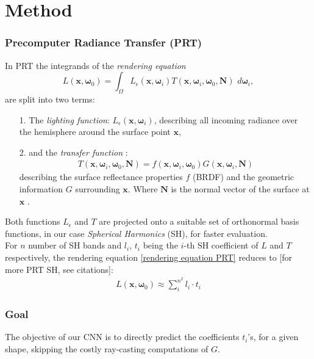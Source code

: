 \section{Method}
\subsubsection*{Precomputer Radiance Transfer (PRT)}
$ \quad $ \\ 

In PRT the integrands of the \textit{rendering equation}
\begin{equation}
L(\bm{x}, \bm{\omega}_0 ) = 
\int_{\Omega} L_{\epsilon}(\bm{x}, \bm{\omega}_i ) 
T(\bm{x},\bm{\omega}_i,\bm{\omega}_0, \bm{N}) 
\,  \, d\bm{\omega}_i ,
\label{rendering equation PRT}
\end{equation}
 are split into two terms:
\begin{itemize}
\item[1.] The \textit{lighting function}: $L_{\epsilon}(\bm{x}, \bm{\omega}_i ) $, describing all incoming radiance over the hemisphere around the surface point $\bm{x} $,
\item[2.] and the \textit{transfer function} :  
\begin{align*}
T(\bm{x},\bm{\omega}_i,\bm{\omega}_0, \bm{N}) = f(\bm{x},\bm{\omega}_i,\bm{\omega}_0) G(\bm{x},\bm{\omega}_i,\bm{N}) 
\end{align*}
describing the surface reflectance properties $f$ (BRDF) and the geometric information $G$ surrounding $\bm{x}$. 
Where $\bm{N}$ is the normal vector of the surface at $\bm{x}$ .
\end{itemize}
Both functions $L_{\epsilon} $ and $T$ are projected onto a suitable set of orthonormal basis functions, in our case \textit{Spherical Harmonics} (SH), for faster evaluation.\\
For $n$ number of SH bands and $l_i$, $t_i$ being the $i$-th SH coefficient of $L$ and $T$ respectively, the rendering equation \ref{rendering equation PRT} reduces to  [for more PRT SH, see citations]: 
\begin{align*}
L(\bm{x}, \bm{\omega}_0 ) \approx \sum_{i}^{n^2} l_i \cdot t_i
\end{align*}
\subsubsection*{Goal}
The objective of our CNN is to directly predict the coefficients $t_i$'s, for a given shape, skipping the costly ray-casting computations of $G$. 
